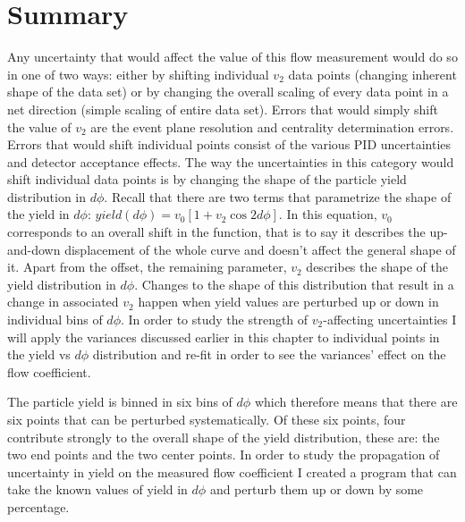 \section{Summary}
Any uncertainty that would affect the value of this flow measurement would do so in one of two ways: either by shifting individual $v_2$ data points (changing inherent shape of the data set) or by changing the overall scaling of every data point in a net direction (simple scaling of entire data set). Errors that would simply shift the value of $v_2$ are the event plane resolution and centrality determination errors. Errors that would shift individual points consist of the various PID uncertainties and detector acceptance effects. The way the uncertainties in this category would shift individual data points is by changing the shape of the particle yield distribution in $d\phi$. Recall that there are two terms that parametrize the shape of the yield in $d\phi$: $yield(d\phi) = v_0 [1 + v_2 \cos 2d\phi]$. In this equation, $v_0$ corresponds to an overall shift in the function, that is to say it describes the up-and-down displacement of the whole curve and doesn't affect the general shape of it. Apart from the offset, the remaining parameter, $v_2$ describes the shape of the yield distribution in $d\phi$. Changes to the shape of this distribution that result in a change in associated $v_2$ happen when yield values are perturbed up or down in individual bins of $d\phi$. In order to study the strength of $v_2$-affecting uncertainties I will apply the variances discussed earlier in this chapter to individual points in the yield vs $d\phi$ distribution and re-fit in order to see the variances' effect on the flow coefficient. 

The particle yield is binned in six bins of $d\phi$ which therefore means that there are six points that can be perturbed systematically. Of these six points, four contribute strongly to the overall shape of the yield distribution, these are: the two end points and the two center points. In order to study the propagation of uncertainty in yield on the measured flow coefficient I created a program that can take the known values of yield in $d\phi$ and perturb them up or down by some percentage. 
\pagebreak
\pagebreak
